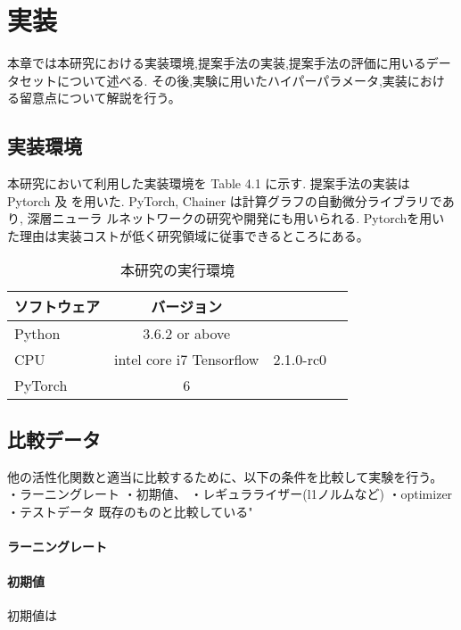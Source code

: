 \chapter{実装}
\label{implementation}

本章では本研究における実装環境,提案手法の実装,提案手法の評価に用いるデータセットについて述べる.
その後,実験に用いたハイパーパラメータ,実装における留意点について解説を行う。


\section{実装環境}



本研究において利用した実装環境を Table 4.1 に示す. 提案手法の実装は Pytorch 及
を用いた.  PyTorch, Chainer は計算グラフの自動微分ライブラリであり, 深層ニューラ
ルネットワークの研究や開発にも用いられる.
Pytorchを用いた理由は実装コストが低く研究領域に従事できるところにある。



\begin{table}[htbp]
    \caption{本研究の実行環境}
    \begin{tabular}{l*{2}{c}r}
    ソフトウェア              & バージョン \\
    \hline
    Python            & 3.6.2 or above \\
    CPU               & intel core i7
    Tensorflow        & 2.1.0-rc0 \\
    PyTorch           & 6 \\
    \end{tabular}
\end{table}



\section{比較データ}

他の活性化関数と適当に比較するために、以下の条件を比較して実験を行う。
・ラーニングレート
・初期値、
・レギュラライザー(l1ノルムなど)
・optimizer
・テストデータ
既存のものと比較している"
\subsubsection{ラーニングレート}

\subsubsection{初期値}
初期値は
